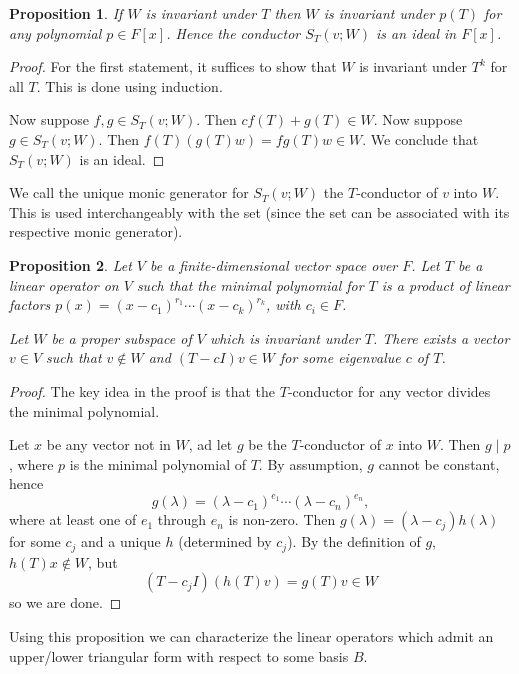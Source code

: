 \documentclass[12pt]{article}
\theoremstyle{plain}
\newtheorem{prop}{Proposition}
\theoremstyle{definition}
\begin{document}
\begin{prop}
If $W$ is invariant under $T$ then $W$ is invariant under $p(T)$ for any polynomial $p \in F[x]$. Hence the conductor $S_T(v; W)$ is an ideal in $F[x]$.
\end{prop}
\begin{proof}
For the first statement, it suffices to show that $W$ is invariant under $T^k$ for all $T$. This is done using induction.

Now suppose $f, g \in S_T(v; W)$. Then $cf(T) + g(T) \in W$. Now suppose $g \in S_T(v; W)$. Then $f(T)(g(T)w) = fg(T)w \in W$. We conclude that $S_T(v; W)$ is an ideal.
\end{proof}

We call the unique monic generator for $S_T(v; W)$ the $T$-conductor of $v$ into $W$. This is used interchangeably with the set (since the set can be associated with its respective monic generator).

\begin{prop}
Let $V$ be a finite-dimensional vector space over $F$. Let $T$ be a linear operator on $V$ such that the minimal polynomial for $T$ is a product of linear factors $p(x) = (x - c_1)^{r_1}\cdots(x-c_k)^{r_k}$, with $c_i \in F$.

Let $W$ be a proper subspace of $V$ which is invariant under $T$. There exists a vector $v \in V$ such that $v \not\in W$ and $(T - cI)v \in W$ for some eigenvalue $c$ of $T$.
\end{prop}
\begin{proof}
The key idea in the proof is that the $T$-conductor for any vector divides the minimal polynomial. 

Let $x$ be any vector not in $W$, ad let $g$ be the $T$-conductor of $x$ into $W$. Then $g \mid p$, where $p$ is the minimal polynomial of $T$. By assumption, $g$ cannot be constant, hence 
\[g(\lambda) = (\lambda - c_1)^{e_1}\cdots(\lambda- c_n)^{e_n},\] where at least one of $e_1$ through $e_n$ is non-zero. Then $g(\lambda) = (\lambda - c_j)h(\lambda)$ for some $c_j$ and a unique $h$ (determined by $c_j$). By the definition of $g$, $h(T)x \not\in W$, but 
\[(T - c_jI)(h(T)v) = g(T)v \in W\] so we are done.
\end{proof}

Using this proposition we can characterize the linear operators which admit an upper/lower triangular form with respect to some basis $B$.
\end{document}

